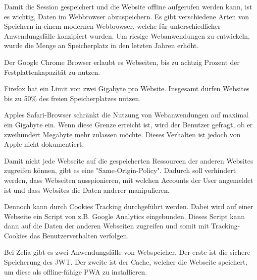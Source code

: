 

Damit die Session gespeichert und die Website offline aufgerufen werden kann, ist es wichtig, Daten im Webbrowser abzuspeichern. Es gibt verschiedene Arten von Speichern in einem modernen Webbrowser, welche für unterschiedlicher Anwendungsfälle konzipiert wurden. Um riesige Webanwendungen zu entwickeln, wurde die Menge an Speicherplatz in den letzten Jahren erhöht. 


Der Google Chrome Browser erlaubt es Webseiten, bis zu achtzig Prozent der Festplattenkapazität zu nutzen.

Firefox hat ein Limit von zwei Gigabyte pro Website. Insgesamt dürfen Websites bis zu 50\% des freien Speicherplatzes nutzen.

Apples Safari-Browser schränkt die Nutzung von Webanwendungen auf maximal ein Gigabyte ein. Wenn diese Grenze erreicht ist, wird der Benutzer gefragt, ob er zweihundert Megabyte mehr zulassen möchte. Dieses Verhalten ist jedoch von Apple nicht dokumentiert. \cite{WebDevStorage}


Damit nicht jede Webseite auf die gespeicherten Ressourcen der anderen Websites zugreifen können, gibt es eine "Same-Origin-Policy". Dadurch soll verhindert werden, dass Webseiten ausspionieren, mit welchen Accounts der User angemeldet ist und dass Websites die Daten anderer manipulieren.

Dennoch kann durch Cookies Tracking durchgeführt werden. Dabei wird auf einer Webseite ein Script von z.B. Google Analytics eingebunden. Dieses Script kann dann auf die Daten der anderen Webseiten zugreifen und somit mit Tracking-Cookies das Benutzerverhalten verfolgen.








Bei Zelia gibt es zwei Anwendungsfälle von Webspeicher. Der erste ist die sichere Speicherung des JWT. Der zweite ist der Cache, welcher die Webseite speichert, um diese als offline-fähige PWA zu installieren.

